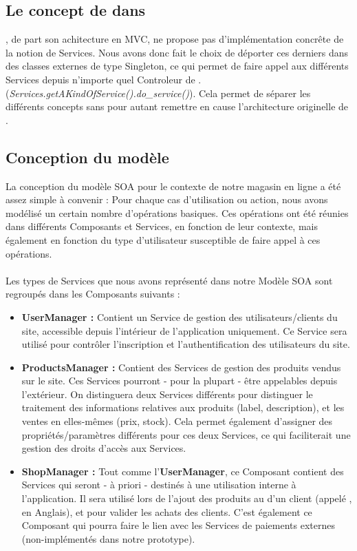 \subsection{Le concept de \kwsoa{} dans \kwplay{}}

\kwplay{}, de part son achitecture en MVC, ne propose pas d'implémentation concrête de la notion de Services. 
Nous avons donc fait le choix de déporter ces derniers dans des classes externes de type Singleton, ce qui permet de faire appel aux différents Services depuis n'importe quel Controleur de \kwplay{}. (\textit{Services.getAKindOfService().do\_service()}). 
Cela permet de séparer les différents concepts sans pour autant remettre en cause l'architecture originelle de \kwplay{}.

\subsection{Conception du modèle}

La conception du modèle SOA pour le contexte de notre magasin en ligne a été assez simple à convenir : Pour chaque cas d'utilisation ou action, nous avons modélisé un certain nombre d'opérations basiques. Ces opérations ont été réunies dans différents Composants et Services, en fonction de leur contexte, mais également en fonction du type d'utilisateur susceptible de faire appel à ces opérations.
\\\\
Les types de Services que nous avons représenté dans notre Modèle SOA sont regroupés dans les Composants suivants :
\begin{itemize}
\item \textbf{UserManager :} Contient un Service de gestion des utilisateurs/clients du site, accessible depuis l'intérieur de l'application uniquement. Ce Service sera utilisé pour contrôler l'inscription et l'authentification des utilisateurs du site.
\item \textbf{ProductsManager :} Contient des Services de gestion des produits vendus sur le site. Ces Services pourront - pour la plupart - être appelables depuis l'extérieur. On distinguera deux Services différents pour distinguer le traitement des informations relatives aux produits (label, description), et les ventes en elles-mêmes (prix, stock). Cela permet également d'assigner des propriétés/paramètres différents pour ces deux Services, ce qui faciliterait une gestion des droits d'accès aux Services.
\item \textbf{ShopManager :} Tout comme l'\textbf{UserManager}, ce Composant contient des Services qui seront - à priori - destinés à une utilisation interne à l'application. Il sera utilisé lors de l'ajout des produits au  d'un client (appelé , en Anglais), et pour valider les achats des clients. C'est également ce Composant qui pourra faire le lien avec les Services de paiements externes (non-implémentés dans notre prototype).
\end{itemize}

